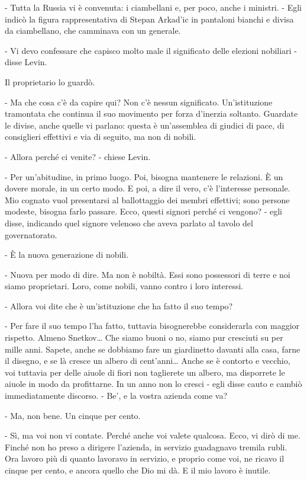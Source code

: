 - Tutta la Russia vi è convenuta: i ciambellani e, per poco, anche i ministri. - Egli indicò la figura rappresentativa di Stepan Arkad'ic in pantaloni bianchi e divisa da ciambellano, che camminava con un generale. 

- Vi devo confessare che capisco molto male il significato delle elezioni nobiliari - disse Levin. 

Il proprietario lo guardò. 

- Ma che cosa c'è da capire qui? Non c'è nessun significato. Un'istituzione tramontata che continua il suo movimento per forza d'inerzia soltanto. Guardate le divise, anche quelle vi parlano: questa è un'assemblea di giudici di pace, di consiglieri effettivi e via di seguito, ma non di nobili. 

- Allora perché ci venite? - chiese Levin. 

- Per un'abitudine, in primo luogo. Poi, bisogna mantenere le relazioni. È un dovere morale, in un certo modo. E poi, a dire il vero, c'è l'interesse personale. Mio cognato vuol presentarsi al ballottaggio dei membri effettivi; sono persone modeste, bisogna farlo passare. Ecco, questi signori perché ci vengono? - egli disse, indicando quel signore velenoso che aveva parlato al tavolo del governatorato. 

- È la nuova generazione di nobili. 

- Nuova per modo di dire. Ma non è nobiltà. Essi sono possessori di terre e noi siamo proprietari. Loro, come nobili, vanno contro i loro interessi. 

- Allora voi dite che è un'istituzione che ha fatto il suo tempo? 

- Per fare il suo tempo l'ha fatto, tuttavia bisognerebbe considerarla con maggior rispetto. Almeno Snetkov\ldots{} Che siamo buoni o no, siamo pur cresciuti su per mille anni. Sapete, anche se dobbiamo fare un giardinetto davanti alla casa, farne il disegno, e se là cresce un albero di cent'anni\ldots{} Anche se è contorto e vecchio, voi tuttavia per delle aiuole di fiori non taglierete un albero, ma disporrete le aiuole in modo da profittarne. In un anno non lo cresci - egli disse cauto e cambiò immediatamente discorso. - Be', e la vostra azienda come va? 

- Ma, non bene. Un cinque per cento. 

- Sì, ma voi non vi contate. Perché anche voi valete qualcosa. Ecco, vi dirò di me. Finché non ho preso a dirigere l'azienda, in servizio guadagnavo tremila rubli. Ora lavoro più di quanto lavoravo in servizio, e proprio come voi, ne ricavo il cinque per cento, e ancora quello che Dio mi dà. E il mio lavoro è inutile. 


